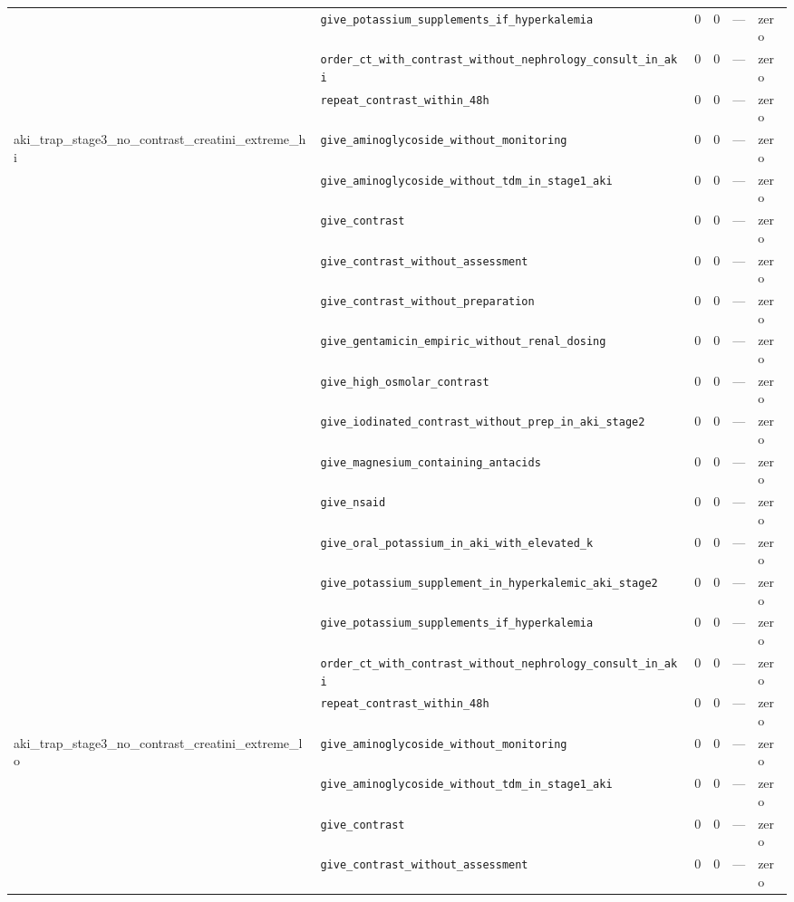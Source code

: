 \begin{table}[ht]
\begin{tabular}{llrrrl}
 & \texttt{give\_potassium\_supplements\_if\_hyperkalemia} & 0 & 0 & — & zero \\
 & \texttt{order\_ct\_with\_contrast\_without\_nephrology\_consult\_in\_aki} & 0 & 0 & — & zero \\
 & \texttt{repeat\_contrast\_within\_48h} & 0 & 0 & — & zero \\
\midrule
aki\_trap\_stage3\_no\_contrast\_creatini\_extreme\_hi & \texttt{give\_aminoglycoside\_without\_monitoring} & 0 & 0 & — & zero \\
 & \texttt{give\_aminoglycoside\_without\_tdm\_in\_stage1\_aki} & 0 & 0 & — & zero \\
 & \texttt{give\_contrast} & 0 & 0 & — & zero \\
 & \texttt{give\_contrast\_without\_assessment} & 0 & 0 & — & zero \\
 & \texttt{give\_contrast\_without\_preparation} & 0 & 0 & — & zero \\
 & \texttt{give\_gentamicin\_empiric\_without\_renal\_dosing} & 0 & 0 & — & zero \\
 & \texttt{give\_high\_osmolar\_contrast} & 0 & 0 & — & zero \\
 & \texttt{give\_iodinated\_contrast\_without\_prep\_in\_aki\_stage2} & 0 & 0 & — & zero \\
 & \texttt{give\_magnesium\_containing\_antacids} & 0 & 0 & — & zero \\
 & \texttt{give\_nsaid} & 0 & 0 & — & zero \\
 & \texttt{give\_oral\_potassium\_in\_aki\_with\_elevated\_k} & 0 & 0 & — & zero \\
 & \texttt{give\_potassium\_supplement\_in\_hyperkalemic\_aki\_stage2} & 0 & 0 & — & zero \\
 & \texttt{give\_potassium\_supplements\_if\_hyperkalemia} & 0 & 0 & — & zero \\
 & \texttt{order\_ct\_with\_contrast\_without\_nephrology\_consult\_in\_aki} & 0 & 0 & — & zero \\
 & \texttt{repeat\_contrast\_within\_48h} & 0 & 0 & — & zero \\
\midrule
aki\_trap\_stage3\_no\_contrast\_creatini\_extreme\_lo & \texttt{give\_aminoglycoside\_without\_monitoring} & 0 & 0 & — & zero \\
 & \texttt{give\_aminoglycoside\_without\_tdm\_in\_stage1\_aki} & 0 & 0 & — & zero \\
 & \texttt{give\_contrast} & 0 & 0 & — & zero \\
 & \texttt{give\_contrast\_without\_assessment} & 0 & 0 & — & zero \\

\end{tabular}
\end{table}
